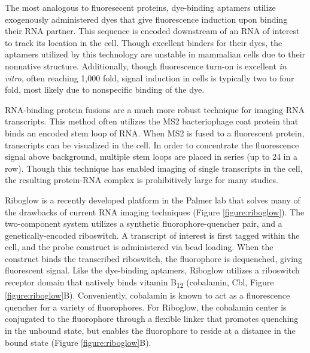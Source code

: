 The most analogous to fluoresecent proteins, dye-binding aptamers utilize exogenously administered dyes that give fluorescence induction upon binding their RNA partner\cite{PaigeRNAMimicsGreen2011,FilonovBroccoliRapidSelection2014,AutourFluorogenicRNAMango2018,DolgosheinaRNAMangoAptamerFluorophore2014}.
This sequence is encoded downstream of an RNA of interest to track its location in the cell. Though excellent binders for their dyes, the aptamers utilized by this technology are unstable in mammalian cells due to their nonnative structure\cite{EtzelSyntheticRiboswitchesPlug2017,IiiStructuralbasishighaffinity2017,WarnerStructuralbasisactivity2014,JengFluorophoreligandbinding2016}.
Additionally, though fluorescence turn-on is excellent \textit{in vitro}, often reaching 1,000 fold, signal induction in cells is typically two to four fold, most likely due to nonspecific binding of the dye.\cite{AutourFluorogenicRNAMango2018}

RNA-binding protein fusions are a much more robust technique for imaging RNA transcripts\cite{FuscoSinglemRNAMolecules2003}. This method often utilizes the MS2 bacteriophage coat protein that binds an encoded stem loop of RNA. When MS2 is fused to a fluorescent protein, transcripts can be visualized in the cell. In order to concentrate the fluorescence signal above background, multiple stem loops are placed in series (up to 24 in a row). Though this technique has enabled imaging of single transcripts in the cell\cite{MorisakiRealtimequantificationsingle2016,FuscoSinglemRNAMolecules2003}, the resulting protein-RNA complex is prohibitively large for many studies\cite{TutucciimprovedMS2system2018}.

Riboglow is a recently developed platform in the Palmer lab that solves many of the drawbacks of current RNA imaging techniques (Figure \ref{figure:riboglow})\cite{BraselmannDevelopmentriboswitchbasedplatform2017}. The two-component system utilizes a synthetic fluorophore-quencher pair, and a genetically-encoded riboswitch. A transcript of interest is first tagged within the cell, and the probe construct is administered via bead loading\cite{McNeilGlassbeadsload1987,Hayashi-TakanakaTrackingepigenetichistone2011,MorisakiRealtimequantificationsingle2016}.
When the construct binds the transcribed riboswitch, the fluorophore is dequenched, giving fluorescent signal. Like the dye-binding aptamers, Riboglow utilizes a riboswitch receptor domain that natively binds vitamin B\textsubscript{12} (cobalamin, Cbl, Figure \ref{figure:riboglow}B)\cite{JohnsonJrB12cofactorsdirectly2012}.
Conveniently, cobalamin is known to act as a fluorescence quencher for a variety of fluorophores\cite{RosendahlSynthesisbiologicalactivity1982,LeeDesignSynthesisCharacterization2009,SmeltzerSynthesisCharacterizationFluorescent2001}.
For Riboglow, the cobalamin center is conjugated to the fluorophore through a flexible linker that promotes quenching in the unbound state, but enables the fluorophore to reside at a distance in the bound state (Figure \ref{figure:riboglow}B).

